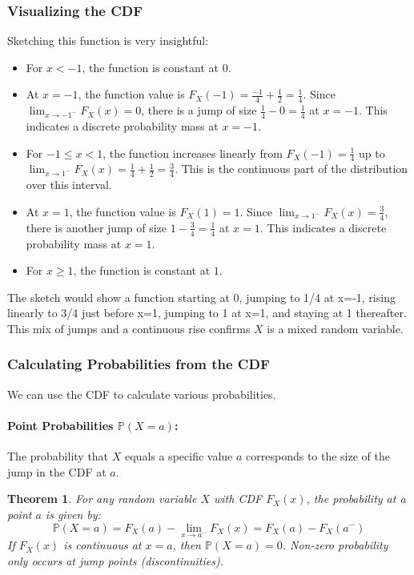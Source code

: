 \documentclass[11pt]{article}
\theoremstyle{mytheoremstyle}
\newtheorem{theorem}{Theorem}[section]
\theoremstyle{mydefinitionstyle}
\newcommand{\Prob}{\mathbb{P}} %
\begin{document}
\subsubsection{Visualizing the CDF}

Sketching this function is very insightful:
\begin{itemize}
    \item For $x < -1$, the function is constant at $0$.
    \item At $x=-1$, the function value is $F_X(-1) = \frac{-1}{4} + \frac{1}{2} = \frac{1}{4}$. Since $\lim_{x \to -1^-} F_X(x) = 0$, there is a jump of size $\frac{1}{4} - 0 = \frac{1}{4}$ at $x=-1$. This indicates a discrete probability mass at $x=-1$.
    \item For $-1 \le x < 1$, the function increases linearly from $F_X(-1) = \frac{1}{4}$ up to $\lim_{x \to 1^-} F_X(x) = \frac{1}{4} + \frac{1}{2} = \frac{3}{4}$. This is the continuous part of the distribution over this interval.
    \item At $x=1$, the function value is $F_X(1) = 1$. Since $\lim_{x \to 1^-} F_X(x) = \frac{3}{4}$, there is another jump of size $1 - \frac{3}{4} = \frac{1}{4}$ at $x=1$. This indicates a discrete probability mass at $x=1$.
    \item For $x \ge 1$, the function is constant at $1$.
\end{itemize}
The sketch would show a function starting at 0, jumping to 1/4 at x=-1, rising linearly to 3/4 just before x=1, jumping to 1 at x=1, and staying at 1 thereafter. This mix of jumps and a continuous rise confirms $X$ is a mixed random variable.

\subsubsection{Calculating Probabilities from the CDF}

We can use the CDF to calculate various probabilities.

\paragraph{Point Probabilities $\Prob(X=a)$:}
The probability that $X$ equals a specific value $a$ corresponds to the size of the jump in the CDF at $a$.
\begin{theorem}
For any random variable $X$ with CDF $F_X(x)$, the probability at a point $a$ is given by:
\[ \Prob(X=a) = F_X(a) - \lim_{x \to a^-} F_X(x) = F_X(a) - F_X(a^-) \]
If $F_X(x)$ is continuous at $x=a$, then $\Prob(X=a) = 0$. Non-zero probability only occurs at jump points (discontinuities).
\end{theorem}
\end{document}
